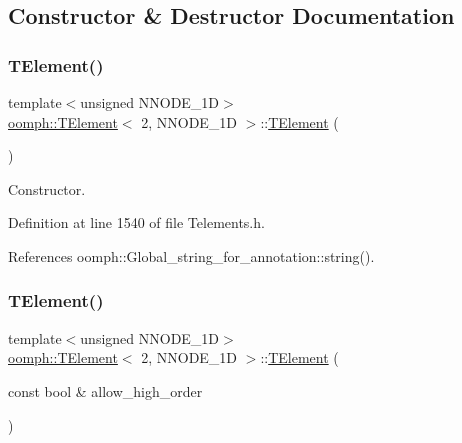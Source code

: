 \subsection{Constructor \& Destructor Documentation}
\mbox{\label{classoomph_1_1TElement_3_012_00_01NNODE__1D_01_4_a1954e5fad1d12b16e5c0bc64f3c12c97}} 
\subsubsection{\texorpdfstring{T\+Element()}{TElement()}\hspace{0.1cm}{\footnotesize\ttfamily [1/3]}}
{\footnotesize\ttfamily template$<$unsigned N\+N\+O\+D\+E\+\_\+1D$>$ \\
\hyperlink{classoomph_1_1TElement}{oomph\+::\+T\+Element}$<$ 2, N\+N\+O\+D\+E\+\_\+1D $>$\+::\hyperlink{classoomph_1_1TElement}{T\+Element} (\begin{DoxyParamCaption}{ }\end{DoxyParamCaption})\hspace{0.3cm}{\ttfamily [inline]}}



Constructor. 



Definition at line 1540 of file Telements.\+h.



References oomph\+::\+Global\+\_\+string\+\_\+for\+\_\+annotation\+::string().

\mbox{\label{classoomph_1_1TElement_3_012_00_01NNODE__1D_01_4_ae4a243526a78edfda756af931f9d2f60}} 
\subsubsection{\texorpdfstring{T\+Element()}{TElement()}\hspace{0.1cm}{\footnotesize\ttfamily [2/3]}}
{\footnotesize\ttfamily template$<$unsigned N\+N\+O\+D\+E\+\_\+1D$>$ \\
\hyperlink{classoomph_1_1TElement}{oomph\+::\+T\+Element}$<$ 2, N\+N\+O\+D\+E\+\_\+1D $>$\+::\hyperlink{classoomph_1_1TElement}{T\+Element} (\begin{DoxyParamCaption}\item[{const bool \&}]{allow\+\_\+high\+\_\+order }\end{DoxyParamCaption})\hspace{0.3cm}{\ttfamily [inline]}}



